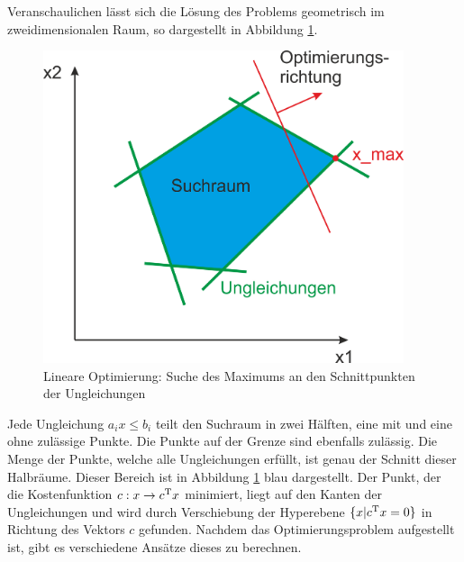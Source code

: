 \documentclass{like}
\begin{document}
Veranschaulichen lässt sich die Lösung des Problems geometrisch im zweidimensionalen Raum, so dargestellt in Abbildung \ref{fig:linOpt}.

\begin{figure}[ht!]
	\centering
	\includegraphics[width=300pt]{Abbildungen/linearOpt.png}
	\caption{Lineare Optimierung: Suche des Maximums an den Schnittpunkten der Ungleichungen}
	\label{fig:linOpt}
\end{figure}

Jede Ungleichung $a_i x \leq b_i$ teilt den Suchraum in zwei Hälften, eine mit und eine ohne zulässige Punkte. Die Punkte auf der Grenze sind ebenfalls zulässig. Die Menge der Punkte, welche alle Ungleichungen erfüllt, ist genau der Schnitt dieser Halbräume. Dieser Bereich ist in Abbildung \ref{fig:linOpt} blau dargestellt. Der Punkt, der die Kostenfunktion $c: x \rightarrow c\textsuperscript{T} x$ minimiert, liegt auf den Kanten der Ungleichungen und wird durch Verschiebung der Hyperebene $ \{x| c\textsuperscript{T} x = 0 \}$ in Richtung des Vektors \(c\) gefunden. Nachdem das Op\-ti\-mie\-rungs\-pro\-blem aufgestellt ist, gibt es verschiedene Ansätze dieses zu berechnen.
\end{document}
